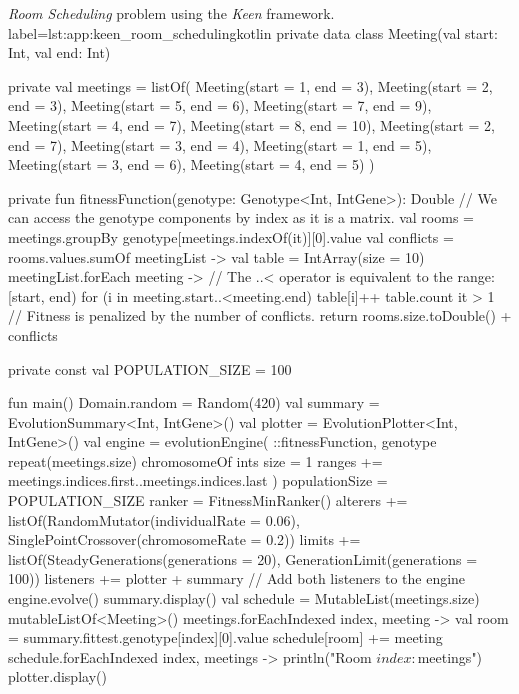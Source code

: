 \begin{code}{
  \textit{Room Scheduling} problem using the \textit{Keen} framework.
}{label=lst:app:keen_room_scheduling}{kotlin}
  private data class Meeting(val start: Int, val end: Int)

  private val meetings =
      listOf(
          Meeting(start = 1, end = 3),
          Meeting(start = 2, end = 3),
          Meeting(start = 5, end = 6),
          Meeting(start = 7, end = 9),
          Meeting(start = 4, end = 7),
          Meeting(start = 8, end = 10),
          Meeting(start = 2, end = 7),
          Meeting(start = 3, end = 4),
          Meeting(start = 1, end = 5),
          Meeting(start = 3, end = 6),
          Meeting(start = 4, end = 5)
      )
  
  private fun fitnessFunction(genotype: Genotype<Int, IntGene>): Double {
      // We can access the genotype components by index as it is a matrix.
      val rooms = meetings.groupBy { genotype[meetings.indexOf(it)][0].value }
      val conflicts = rooms.values.sumOf { meetingList ->
          val table = IntArray(size = 10)
          meetingList.forEach { meeting ->
              // The ..< operator is equivalent to the range: [start, end)
              for (i in meeting.start..<meeting.end) {
                  table[i]++
              }
          }
          table.count { it > 1 }
      }
      // Fitness is penalized by the number of conflicts.
      return rooms.size.toDouble() + conflicts
  }
  
  private const val POPULATION_SIZE = 100
  
  fun main() {
      Domain.random = Random(420)
      val summary = EvolutionSummary<Int, IntGene>()
      val plotter = EvolutionPlotter<Int, IntGene>()
      val engine = evolutionEngine(
          ::fitnessFunction,
          genotype {
              repeat(meetings.size) {
                  chromosomeOf {
                      ints {
                          size = 1
                          ranges  += meetings.indices.first..meetings.indices.last
                      }
                  }
              }
          }) {
          populationSize = POPULATION_SIZE
          ranker = FitnessMinRanker()
          alterers += listOf(RandomMutator(individualRate = 0.06), SinglePointCrossover(chromosomeRate = 0.2))
          limits += listOf(SteadyGenerations(generations = 20), GenerationLimit(generations = 100))
          listeners += plotter + summary  // Add both listeners to the engine
      }
      engine.evolve()
      summary.display()
      val schedule = MutableList(meetings.size) { mutableListOf<Meeting>() }
      meetings.forEachIndexed { index, meeting ->
          val room = summary.fittest.genotype[index][0].value
          schedule[room] += meeting
      }
      schedule.forEachIndexed { index, meetings ->
          println("Room $index: $meetings")
      }
      plotter.display()
  }
\end{code}

